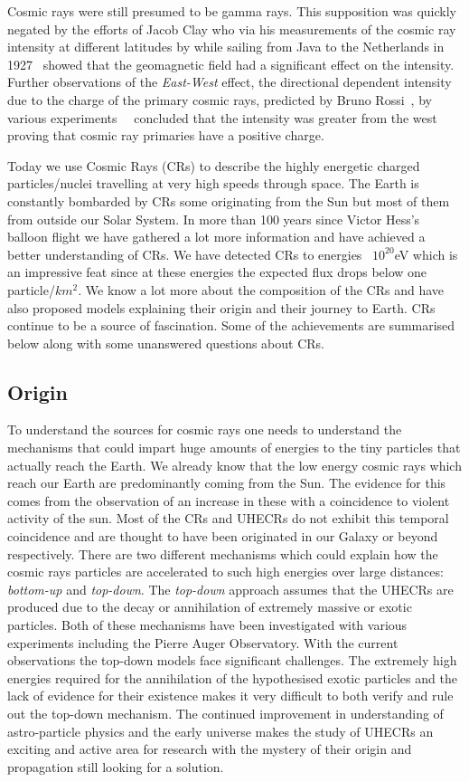 Cosmic rays were still presumed to be gamma rays. This supposition was quickly negated by the efforts of Jacob Clay who via his measurements of the cosmic ray intensity at different latitudes by while sailing from Java to the Netherlands in 1927~\cite{} showed that the geomagnetic field had a significant effect on the intensity. Further observations of the \textit{East-West} effect, the directional dependent intensity due to the charge of the primary cosmic rays, predicted by Bruno Rossi~\cite{}, by various experiments~\cite{}~\cite{} concluded that the intensity was greater from the west proving that cosmic ray primaries have a positive charge.

Today we use Cosmic Rays (CRs) to describe the highly energetic charged particles/nuclei travelling at very high speeds through space. The Earth is constantly bombarded by CRs some originating from the Sun but most of them from outside our Solar System. In more than 100 years since Victor Hess's balloon flight we have gathered a lot more information and have achieved a better understanding of CRs. We have detected CRs to energies ~$10^{20}$eV which is an impressive feat since at these energies the expected flux drops below one particle/$km^2$. We know a lot more about the composition of the CRs and have also proposed models explaining their origin and their journey to Earth. CRs continue to be a source of fascination. Some of the achievements are summarised below along with some unanswered questions about CRs. 

\subsection{Origin}

To understand the sources for cosmic rays one needs to understand the mechanisms that could impart huge amounts of energies to the tiny particles that actually reach the Earth. We already know that the low energy cosmic rays which reach our Earth are predominantly coming from the Sun. The evidence for this comes from the observation of an increase in these with a coincidence to violent activity of the sun. Most of the CRs and UHECRs do not exhibit this temporal coincidence and are thought to have been originated in our Galaxy or beyond respectively. There are two different mechanisms which could explain how the cosmic rays particles are accelerated to such high energies over large distances: \textit{bottom-up} and \textit{top-down}. The \textit{top-down} approach assumes that the UHECRs are produced due to the decay or annihilation of extremely massive or exotic particles.
Both of these mechanisms have been investigated with various experiments including the Pierre Auger Observatory. With the current observations the top-down models face significant challenges. The extremely high energies required for the annihilation of the hypothesised exotic particles and the lack of evidence for their existence makes it very difficult to both verify and rule out the top-down mechanism. The continued improvement in understanding of astro-particle physics and the early universe makes the study of UHECRs an exciting and active area for research with the mystery of their origin and propagation still looking for a solution. 

